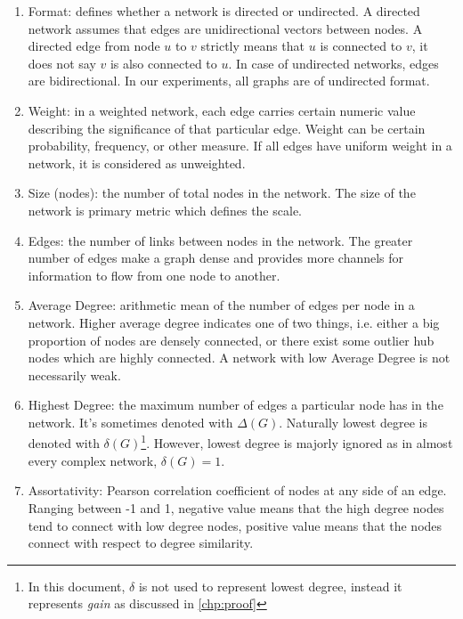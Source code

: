 	\begin{enumerate}
		
		\item Format: defines whether a network is directed or undirected. A directed network assumes that edges are unidirectional vectors between nodes. A directed edge from node $u$ to $v$ strictly means that $u$ is connected to $v$, it does not say $v$ is also connected to $u$. In case of undirected networks, edges are bidirectional. In our experiments, all graphs are of undirected format.		
		
		\item Weight: in a weighted network, each edge carries certain numeric value describing the significance of that particular edge. Weight can be certain probability, frequency, or other measure. If all edges have uniform weight in a network, it is considered as unweighted.
		
		\item Size (nodes): the number of total nodes in the network. The size of the network is primary metric which defines the scale.
		
		\item Edges: the number of links between nodes in the network. The greater number of edges make a graph dense and provides more channels for information to flow from one node to another.
		
		\item Average Degree: arithmetic mean of the number of edges per node in a network. Higher average degree indicates one of two things, i.e. either a big proportion of nodes are densely connected, or there exist some outlier hub nodes which are highly connected. A network with low Average Degree is not necessarily weak.
		
		\item Highest Degree: the maximum number of edges a particular node has in the network. It's sometimes denoted with $\Delta(G)$. Naturally lowest degree is denoted with $\delta(G)$\footnote{In this document, $\delta$ is not used to represent lowest degree, instead it represents \textit{gain} as discussed in \ref{chp:proof}}. However, lowest degree is majorly ignored as in almost every complex network, $\delta(G)=1$.
				
		\item Assortativity: Pearson correlation coefficient of nodes at any side of an edge. Ranging between -1 and 1, negative value means that the high degree nodes tend to connect with low degree nodes, positive value means that the nodes connect with respect to degree similarity.
		

\end{enumerate}
